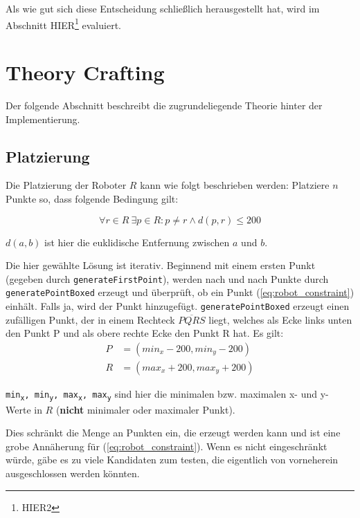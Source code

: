\documentclass{article}
\newcommand{\subs}[2]{#1\textsubscript{#2}}
\begin{document}
Als wie gut sich diese Entscheidung schließlich herausgestellt hat, wird im Abschnitt 
HIER\footnote{HIER2} evaluiert.

\clearpage
\section{Theory Crafting}

Der folgende Abschnitt beschreibt die zugrundeliegende Theorie hinter der Implementierung.

\subsection{Platzierung}

Die Platzierung der Roboter $R$ kann wie folgt beschrieben werden: Platziere $n$ Punkte so, dass folgende Bedingung gilt:

\begin{equation}
\forall r \in R \  \exists p \in R : p \neq r \wedge d(p,r) \le 200 
\label{eq:robot_constraint}
\end{equation}

$d(a,b)$ ist hier die euklidische Entfernung zwischen $a$ und $b$.

Die hier gewählte Lösung ist iterativ. Beginnend mit einem ersten Punkt (gegeben durch \texttt{generateFirstPoint}),
werden nach und nach Punkte durch \texttt{generatePointBoxed} erzeugt und überprüft, ob ein Punkt (\ref{eq:robot_constraint}) einhält. Falls ja,
wird der Punkt hinzugefügt. \texttt{generatePointBoxed} erzeugt einen zufälligen Punkt, der in einem Rechteck 
$\overline{PQRS}$ liegt, welches als Ecke links unten den Punkt P und als obere rechte Ecke den Punkt R hat. Es gilt:
\begin{align*}
P &= (min_x - 200, min_y - 200) \\
R &= (max_x + 200, max_y + 200)
\end{align*}

\texttt{\subs{min}{x}, \subs{min}{y}, \subs{max}{x}, \subs{max}{y}} sind hier die minimalen bzw. maximalen x- und y- Werte in $R$ (\textbf{nicht} minimaler
oder maximaler Punkt).

Dies schränkt die Menge an Punkten ein, die erzeugt werden kann und ist eine grobe Annäherung für (\ref{eq:robot_constraint}).
Wenn es nicht eingeschränkt würde, gäbe es zu viele Kandidaten zum testen, die eigentlich von vorneherein 
ausgeschlossen werden könnten.
\end{document}
